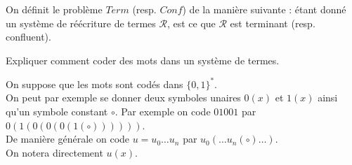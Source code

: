 \documentclass[12pt,letterpaper,boxed]{hmcpset}
\begin{document}
\newpage

On définit le problème $Term$ (resp. $Conf$) de la manière suivante : étant donné un système
de réécriture de termes $\mathcal{R}$, est ce que $\mathcal{R}$ est terminant (resp. confluent). \\

\begin{problem}[Question 1]
Expliquer comment coder des mots dans un système de termes.
\end{problem}
\begin{solution}
On suppose que les mots sont codés dans $\{0,1\}^{*}$. \\
On peut par exemple se donner deux symboles unaires $0(x)$ et $1(x)$ ainsi qu'un symbole
constant $\circ$.  Par exemple on code $01001$ par $0(1(0(0(0(1(\circ))))))$.\\
De manière générale on code $u = u_{0} \dots u_{n}$ par $u_{0}( \dots u_{n}( \circ) \dots )$.\\
On notera directement $u(x)$.
\end{solution}
\end{document}
